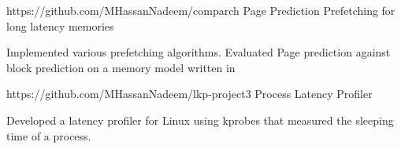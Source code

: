 

\begin{cventries}

  \cventry
    {https://github.com/MHassanNadeem/comparch} %
    {Page Prediction Prefetching for long latency memories} %
    {} %
    {} %
    {
      \begin{cvitems} %
        \item {Implemented various prefetching algorithms. Evaluated Page prediction against block prediction on a memory model written in }
      \end{cvitems}
    }

  \cventry
    {https://github.com/MHassanNadeem/lkp-project3} %
    {Process Latency Profiler} %
    {} %
    {} %
    {
      \begin{cvitems} %
        \item {Developed a latency profiler for Linux using kprobes that measured the sleeping time of a process.}
      \end{cvitems}
    }



\end{cventries}
